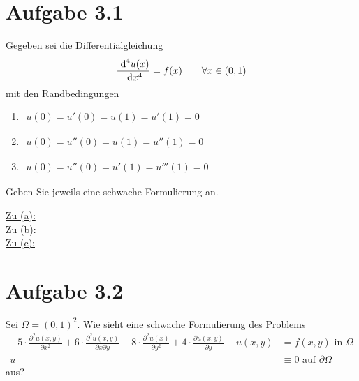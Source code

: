 \documentclass[12pt,a4paper]{article}
\author{Willi Sontopski}
\begin{document}

\section*{Aufgabe 3.1}
Gegeben sei die Differentialgleichung 
\begin{align*}
\frac{\text{ d}^4 u(x)}{\text{ d} x^4}=f(x)\qquad\forall x\in(0,1)
\end{align*}
mit den Randbedingungen
\begin{enumerate}[label=(\alph*)]
\item $\begin{aligned}
u(0)=u'(0)=u(1)=u'(1)=0
\end{aligned}$
\item $\begin{aligned}
u(0)=u''(0)=u(1)=u''(1)=0
\end{aligned}$
\item $\begin{aligned}
u(0)=u''(0)=u'(1)=u'''(1)=0
\end{aligned}$
\end{enumerate}
Geben Sie jeweils eine schwache Formulierung an.

\begin{lösung}
\underline{Zu (a):}\\

\underline{Zu (b):}\\

\underline{Zu (c):}\\

\end{lösung}

\section*{Aufgabe 3.2}
Sei $\Omega=(0,1)^2$. Wie sieht eine schwache Formulierung des Problems
\begin{align*}
-5\cdot\frac{\partial^2 u(x,y)}{\partial x^2}+6\cdot\frac{\partial^2 u(x,y)}{\partial x\partial y}-8\cdot\frac{\partial^2 u(x)}{\partial y^2}+4\cdot\frac{\partial u(x,y)}{\partial y}+u(x,y)&=f(x,y) \text{ in }\Omega\\
u&\equiv 0\text{ auf }\partial\Omega
\end{align*}
aus?
\end{document}
